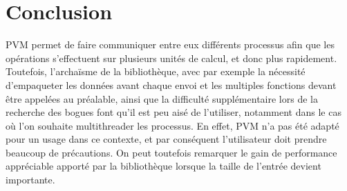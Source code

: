 \documentclass[a4paper,11pt]{article}
\begin{document}
\section{Conclusion}

PVM permet de faire communiquer entre eux différents processus afin que les opérations s'effectuent sur plusieurs unités de calcul, et donc plus rapidement. Toutefois, l'archaïsme de la bibliothèque, avec par exemple la nécessité d'empaqueter les données avant chaque envoi et les multiples fonctions devant être appelées au préalable, ainsi que la difficulté supplémentaire lors de la recherche des bogues font qu'il est peu aisé de l'utiliser, notamment dans le cas où l'on souhaite multithreader les processus. En effet, PVM n'a pas été adapté pour un usage dans ce contexte, et par conséquent l'utilisateur doit prendre beaucoup de précautions. On peut toutefois remarquer le gain de performance appréciable apporté par la bibliothèque lorsque la taille de l'entrée devient importante. 
\end{document}
